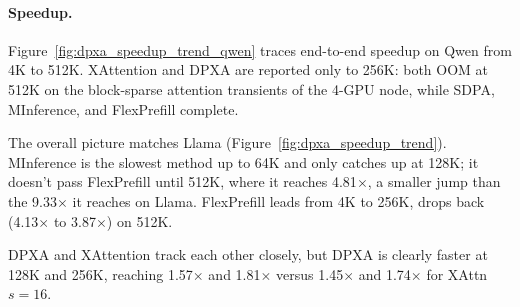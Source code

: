 \paragraph{Speedup.}

Figure~\ref{fig:dpxa_speedup_trend_qwen} traces end-to-end speedup on Qwen from 4K to 512K. XAttention and DPXA are reported only to 256K: both OOM at 512K on the block-sparse attention transients of the 4-GPU node, while SDPA, MInference, and FlexPrefill complete.

The overall picture matches Llama (Figure~\ref{fig:dpxa_speedup_trend}). MInference is the slowest method up to 64K and only catches up at 128K; it doesn't pass FlexPrefill until 512K, where it reaches 4.81$\times$, a smaller jump than the 9.33$\times$ it reaches on Llama. FlexPrefill leads from 4K to 256K, drops back (4.13$\times$ to 3.87$\times$) on 512K.

DPXA and XAttention track each other closely, but DPXA is clearly faster at 128K and 256K, reaching 1.57$\times$ and 1.81$\times$ versus 1.45$\times$ and 1.74$\times$ for XAttn $s{=}16$.


